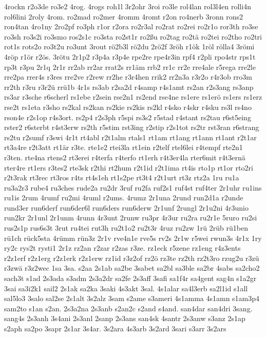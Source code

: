 {4rockn
r2o3de
ro3e2
4rog.
4rogs
roh1l
3r2ohr
3roi
ro3le
rol4lan
rol3l4en
rolli4n
rol6lini
2roly
4rom.
ro2mad
ro2mer
4romm
4romt
r2on
ro4nerb
3ronn
rons2
ron4tan
4ro1ny
2ro2pf
ro3ph
r1or
r2ora
ro2r3al
ro2rat
ro2rei
ro2r1o
ror3th
ro3se
ro3sh
ro3s2i
ro3smo
ros2s1c
ro3sta
ro2st1r
ro2ßu
ro2tag
ro2tä
ro2tei
ro2tho
ro2tri
rot1s
rots2o
ro3t2u
ro3unt
3rout
rö2b3l
rö2du
2rö2f
3röh
r1ök
1röl
rölla4
3römi
4röp
r1ör
r2ös.
3rötu
2r1p2
r3p4a
r3p4e
rpe2re
rpe4r3in
rpf4
r2pli
rpo4str
rps1t
rp3t
r3pu
2r1q
2r1r
rr2ab
rr2ar
rrat2s
rr1äm
rrb2
rr1c
rr2e
rre4ale
r5rega
rre2le
rre2pa
rrer4s
r3res
rre2ve
r2rew
rr2he
r3r4hen
rrik2
rr2n3a
r3r2o
r4r3ob
rro3m
rr2th
r3ru
r3r2ü
rrü1b
4r1s
rs3ab
r2sa2d
r4samp
r4s1amt
rs2an
r2s3ang
rs3anp
rs3ar
r3sche
r6scherl
rs1ebe
r2sein
rse2n1
rs2end
rse4ne
rs1ere
rs1erö
rs1ers
rs1erz
rse2t
rs1eta
r3sho
rs2kal
rs2kan
rs2kie
rs2kis
rs2kl
r4sko
r4skr
r4sku
rs3l
rs4no
rson4e
r2s1op
r4s3ort.
rs2p4
r2s3ph
r5spi
rs3s2
r5stad
r4stant
rs2tau
r6st5eing
rster2
r6sterbt
r4st3erw
rs2th
r5stim
rst3ing
r2stip
r2s1tot
rs2tr
rst3ran
r6strang
rs2tu
r2sumf
r3swi
4r1t
rt4abl
r2t1alm
rtals1
rt1am
rt1ang
rt1ann
rt1ant
r2t1ar
rt3a4re
r2t3att
rt1är
r3te.
rte1e2
rtei3la
rt1ein
r2telf
rtel6lei
r4tempf
rte2n1
r3ten.
rte4na
rtens2
rt3erei
r4terfa
r4terfo
rt1erh
r4t3er4la
rter6mit
r4t3ernä
rter4re
rt1ers
r3tes2
rte3sk
r2thi
rt2hum
r2t1id
r2t1ima
rt4is
rto1p
rt1or
rto2ri
r2t3rak
rt3rec
rt3ros
r4ts
rt4s1eh
rt1s2pe
rt3t4
r2t1urt
rt3z
rtz2a
1ru
ru1a
ru3a2r3
rube4
ru3ches
rude2a
ru2dr
3ruf
ru2fa
ruf2s1
ruf4st
ruf4ter
2r1uhr
ru1ins
ru1is
2rum
4rumf
ru2mi
4ruml
r2ums.
4rumz
2r1una
2rund
run2d1a
r2unde
rund3er
run6derf
run6der6l
run6ders
run6derw
2r1unf
2rungl
2r1u2ni
4r3unio
run2kr
2r1unl
2r1unm
4runn
4r3unt
2runw
ru3pr
4r3ur
ru2ra
ru2r1e
5ruro
ru2si
rus2s1p
rus6s3t
3rut
ru4tei
rut3h
ru2t1o2
ru2t3r
4ruz
ru2zw
1rü
2rüb
rü1ben
rü1ch
rück5sta
4rümm
rün3z
2r1v
rve4n1e
rve5s
rv2s
2r1w
r5wei
rwun3s
4r1x
1ry
ry2c
rys2t
rysti1
2r1z
rz2an
r2zar
r2zas
r3ze.
rz1eck
r5zene
rz1eng
r4z3ents
r2z1erf
r2z1erg
r2z1erk
r2z1erw
rz1id
r3z2of
rz2ö
rz3te
rz2th
rz2t3ro
rzug2u
r3zü
r3zwä
r3z2wec
1sa
3sa.
s2aa
2s1ab
sa2be
3sabet
sa2bl
sa3ble
sa2br
4sabs
sa2cho2
sach3t
s1ad
2s3ada
s3adm
2s3a2dr
sa2fe
2s3aff
3safi
sa1f4r
sa4gent
sag4n
s1a2gr
3sai
sa3i2k1
sail2
2s1ak
sa2ka
3saki
4s3akt
3sal.
4s1alar
sa4l3erb
sa2l1id
s1all
sal5lo3
3salo
sal2se
2s1alt
3s2alz
3sam
s2ame
s3ameri
4s1amma
4s1amn
s1am3p4
sam2to
s1an
s2an.
2s3a2na
2s3anb
s2an2c
s2and
s4and.
san4dar
san4dri
3sang.
sang4s
2s3anh
3s4ani
2s3anl
2sanp
2s3ans
san4sk
4santr
2s3anw
s3anz
2s1ap
s2aph
sa2po
3sapr
2s1ar
3s4ar.
3s2ara
4s3arb
3s2ard
3sari
s3arr
3s2ars
}
